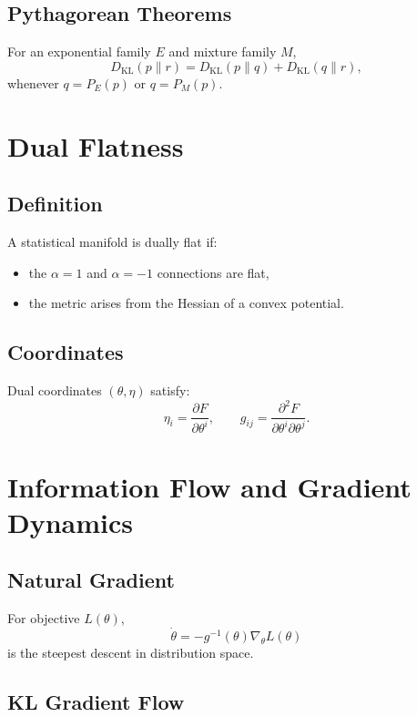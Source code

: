 \subsection{Pythagorean Theorems}

For an exponential family $E$ and mixture family $M$,
\[
D_{\mathrm{KL}}(p\|r)
  = D_{\mathrm{KL}}(p\|q) + D_{\mathrm{KL}}(q\|r),
\]
whenever $q = P_E(p)$ or $q = P_M(p)$.

\section{Dual Flatness}

\subsection{Definition}

A statistical manifold is dually flat if:

\begin{itemize}
\item the $\alpha=1$ and $\alpha=-1$ connections are flat,
\item the metric arises from the Hessian of a convex potential.
\end{itemize}

\subsection{Coordinates}

Dual coordinates $(\theta,\eta)$ satisfy:
\[
\eta_i = \frac{\partial F}{\partial \theta^i}, \qquad
g_{ij} = \frac{\partial^2 F}{\partial\theta^i\partial\theta^j}.
\]

\section{Information Flow and Gradient Dynamics}

\subsection{Natural Gradient}

For objective $L(\theta)$,
\[
\dot{\theta}
  = -g^{-1}(\theta)\nabla_\theta L(\theta)
\]
is the steepest descent in distribution space.

\subsection{KL Gradient Flow}

